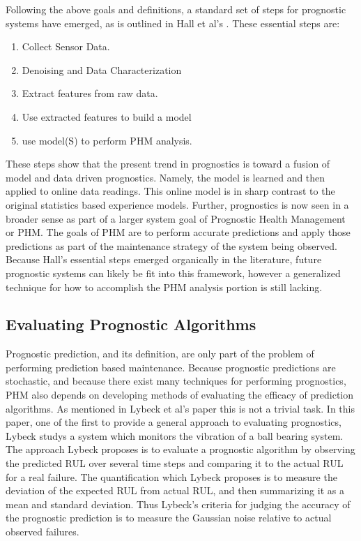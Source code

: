 \documentclass[12pt]{article}
\begin{document}
Following the above goals and definitions, a standard set of steps for
prognostic systems have emerged, as is outlined in Hall et al's
\cite{6024332}.  These essential steps are:
\begin{enumerate}
  \item Collect Sensor Data.
  \item Denoising and Data Characterization
  \item Extract features from raw data.
  \item Use extracted features to build a model
  \item use model(S) to perform PHM analysis.
\end{enumerate}
These steps show that the present trend in prognostics is toward a
fusion of model and data driven prognostics.  Namely, the model is
learned and then applied to online data readings.  This online model
is in sharp contrast to the original statistics based experience
models.  Further, prognostics is now seen in a broader sense as part
of a larger system goal of Prognostic Health Management or PHM.  The
goals of PHM are to perform accurate predictions and apply those
predictions as part of the maintenance strategy of the system being
observed.  Because Hall's essential steps emerged organically in the
literature, future prognostic systems can likely be fit into this
framework, however a generalized technique for how to accomplish the
PHM analysis portion is still lacking.

\subsection{Evaluating Prognostic Algorithms}
Prognostic prediction, and its definition, are only part of the
problem of performing prediction based maintenance.  Because
prognostic predictions are stochastic, and because there exist many
techniques for performing prognostics, PHM also depends on developing
methods of evaluating the efficacy of prediction algorithms.  As
mentioned in Lybeck et al's paper \cite{4161637} this is not a trivial
task.  In this paper, one of the first to provide a general approach
to evaluating prognostics, Lybeck studys a system which monitors the
vibration of a ball bearing system.  The approach Lybeck proposes is
to evaluate a prognostic algorithm by observing the predicted RUL over
several time steps and comparing it to the actual RUL for a real
failure.  The quantification which Lybeck proposes is to measure the
deviation of the expected RUL from actual RUL, and then summarizing it
as a mean and standard deviation.  Thus Lybeck's criteria for judging
the accuracy of the prognostic prediction is to measure the Gaussian
noise relative to actual observed failures.
\end{document}

